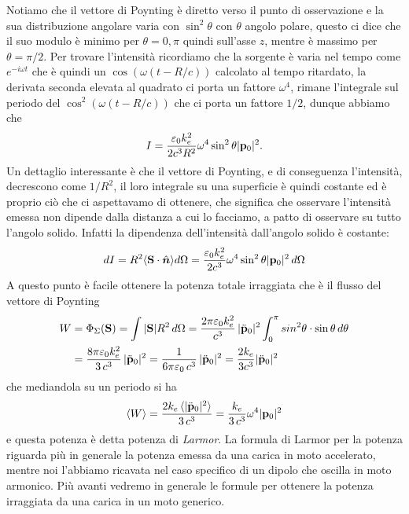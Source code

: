 Notiamo che il vettore di Poynting è diretto verso il punto 
di osservazione e la sua distribuzione angolare varia con $ \sin^2\theta $ con $ \theta $ angolo polare, questo ci dice che il suo modulo è minimo per 
$ \theta = 0,\pi $ quindi sull'asse $ z $, mentre è massimo per $ \theta = \pi/2 $. Per trovare l'intensità ricordiamo che la sorgente è varia nel tempo 
come $ e^{-i\omega t} $ che è quindi un $ \cos\!\left( \omega(t - R/c) \right) $ calcolato al tempo ritardato, la derivata seconda elevata al quadrato 
ci porta un fattore $ \omega^4 $, rimane l'integrale sul periodo del $ \cos^2(\omega (t - R/c))$ che ci porta un fattore $ 1/2 $, dunque abbiamo che
\begin{align}
  I = \frac{\varepsilon_0 k_e^2 }{2c^3 R^2} \omega^4 \sin^2 \theta\lvert \mathbf{p}_0 \rvert^2.
\end{align}
Un dettaglio interessante è che il vettore di Poynting, e di conseguenza l'intensità, decrescono come $ 1/R^2 $, il loro integrale su una superficie è 
quindi costante ed è proprio ciò che ci aspettavamo di ottenere, che significa che osservare l'intensità emessa non dipende dalla distanza a cui lo facciamo, 
a patto di osservare su tutto l'angolo solido. Infatti la dipendenza dell'intensità dall'angolo solido è costante:
\begin{align}
  {dI} = R^2 \langle \mathbf{S} \cdot \hat{\boldsymbol{n}} \rangle {d\Omega}
  = \frac{\varepsilon_0 k_e^2 }{2c^3} \omega^4 \sin^2 \theta\lvert \mathbf{p}_0 \rvert^2 \,{d\Omega}
\end{align}
A questo punto è facile ottenere la potenza totale irraggiata che è il flusso del vettore di Poynting
\begin{align}
  W &= \Phi_\Sigma(\mathbf{S}) = \int |\mathbf{S}| R^2 \,d\Omega 
  = \frac{2\pi\varepsilon_0 k_e^2}{c^3} \, \lvert \ddot{\mathbf{p}}_0 \rvert^2 \int_0^\pi sin^2\theta \cdot \sin \theta \,d\theta 
  \\
  &= \frac{8\pi\varepsilon_0 k_e^2}{3\,c^3}\, \lvert \ddot{\mathbf{p}}_0 \rvert^2 = \frac{1}{6\pi \varepsilon_0 \,c^3}\,\lvert \ddot{\mathbf{p}}_0 \rvert^2 
  = \frac{2 k_e}{3c^3} \lvert \ddot{\mathbf{p}}_0 \rvert^2 
\end{align}
che mediandola su un periodo si ha
\begin{align}
  \langle W \rangle =  \frac{2 k_e\, \langle \lvert \ddot{\mathbf{p}}_0 \rvert^2 \rangle}{3\,c^3} 
  = \frac{k_e}{3\,c^3}  \omega^4 \lvert { \mathbf{p} }_0 \rvert^2
\end{align}
e questa potenza è detta potenza di \textit{Larmor}. La formula di Larmor per la potenza riguarda più in generale la potenza emessa da una carica in 
moto accelerato, mentre noi l'abbiamo ricavata nel caso specifico di un dipolo che oscilla in moto armonico. Più avanti vedremo in generale le formule 
per ottenere la potenza irraggiata da una carica in un moto generico.

